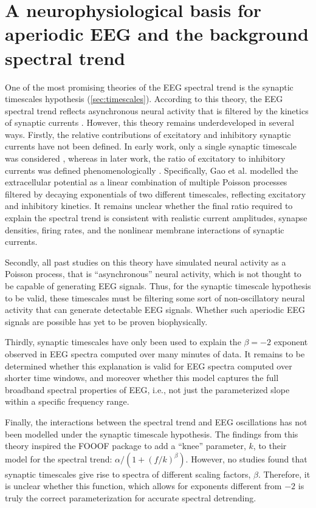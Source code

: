 \chapter{A neurophysiological basis for aperiodic EEG and the background spectral trend} \label{sec:natcomms}

One of the most promising theories of the EEG spectral trend is the synaptic timescales hypothesis (\autoref{sec:timescales}). According to this theory, the EEG spectral trend reflects asynchronous neural activity that is filtered by the kinetics of synaptic currents \cite{Bedard2006,Miller2009, Gao2017}. However, this theory remains underdeveloped in several ways. Firstly, the relative contributions of excitatory and inhibitory synaptic currents have not been defined. In early work, only a single synaptic timescale was considered \cite{Bedard2006,Miller2009}, whereas in later work, the ratio of excitatory to inhibitory currents was defined phenomenologically \cite{Gao2017}. Specifically, Gao et al. \cite{Gao2017} modelled the extracellular potential as a linear combination of multiple Poisson processes filtered by decaying exponentials of two different timescales, reflecting excitatory and inhibitory kinetics. It remains unclear whether the final ratio required to explain the spectral trend is consistent with realistic current amplitudes, synapse densities, firing rates, and the nonlinear membrane interactions of synaptic currents. 

Secondly, all past studies on this theory have simulated neural activity as a Poisson process, that is ``asynchronous'' neural activity, which is not thought to be capable of generating EEG signals. Thus, for the synaptic timescale hypothesis to be valid, these timescales must be filtering some sort of non-oscillatory neural activity that can generate detectable EEG signals. Whether such aperiodic EEG signals are possible has yet to be proven biophysically.

Thirdly, synaptic timescales have only been used to explain the $\beta=-2$ exponent observed in EEG spectra computed over many minutes of data. It remains to be determined whether this explanation is valid for EEG spectra computed over shorter time windows, and moreover whether this model captures the full broadband spectral properties of EEG, i.e., not just the parameterized slope within a specific frequency range. 

Finally, the interactions between the spectral trend and EEG oscillations has not been modelled under the synaptic timescale hypothesis. The findings from this theory inspired the FOOOF package to add a ``knee'' parameter, $k$, to their model for the spectral trend: $\alpha/(1+(f/k)^\beta)$. However, no studies found that synaptic timescales give rise to spectra of different scaling factors, $\beta$. Therefore, it is unclear whether this function, which allows for exponents different from $-2$ is truly the correct parameterization for accurate spectral detrending.

